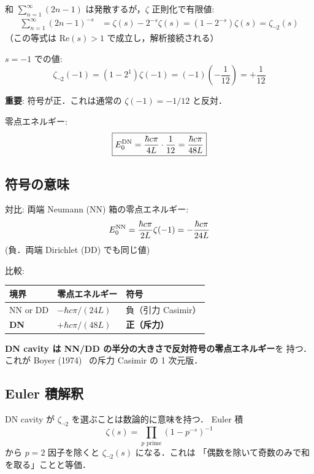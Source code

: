 \documentclass[11pt,a4paper]{article}
\begin{document}
和 $\sum_{n=1}^\infty (2n-1)$ は発散するが，$\zeta$ 正則化で有限値:
\begin{align}
\sum_{n=1}^\infty (2n-1)^{-s} &= \zeta(s) - 2^{-s}\zeta(s) = (1 - 2^{-s})\zeta(s)
= \zeta_{\neg 2}(s)
\end{align}
（この等式は $\text{Re}(s) > 1$ で成立し，解析接続される）

$s = -1$ での値:
\begin{equation}
\zeta_{\neg 2}(-1) = (1 - 2^{1})\zeta(-1) = (-1)\left(-\frac{1}{12}\right) = +\frac{1}{12}
\end{equation}

\textbf{重要}: 符号が正．これは通常の $\zeta(-1) = -1/12$ と反対．

零点エネルギー:
\begin{equation}
\boxed{E_0^{\rm DN} = \frac{\hbar c \pi}{4L}\cdot\frac{1}{12} = \frac{\hbar c \pi}{48 L}}
\end{equation}

\subsection{符号の意味}

対比: 両端 Neumann (NN) 箱の零点エネルギー:
\begin{equation}
E_0^{\rm NN} = \frac{\hbar c \pi}{2L}\zeta(-1) = -\frac{\hbar c \pi}{24 L}
\end{equation}
(負．両端 Dirichlet (DD) でも同じ値)

比較:
\begin{center}
\begin{tabular}{lll}
\toprule
境界 & 零点エネルギー & 符号 \\
\midrule
NN or DD & $-\hbar c\pi/(24L)$ & 負（引力 Casimir）\\
\textbf{DN} & $+\hbar c\pi/(48L)$ & \textbf{正（斥力）}\\
\bottomrule
\end{tabular}
\end{center}

\textbf{DN cavity は NN/DD の半分の大きさで反対符号の零点エネルギー}を
持つ．これが Boyer (1974)~\cite{Boyer1974} の斥力 Casimir の 1 次元版．

\subsection{Euler 積解釈}

DN cavity が $\zeta_{\neg 2}$ を選ぶことは数論的に意味を持つ．
Euler 積
\begin{equation}
\zeta(s) = \prod_{p\text{ prime}}(1 - p^{-s})^{-1}
\end{equation}
から $p = 2$ 因子を除くと $\zeta_{\neg 2}(s)$ になる．これは
「偶数を除いて奇数のみで和を取る」ことと等価．
\end{document}
